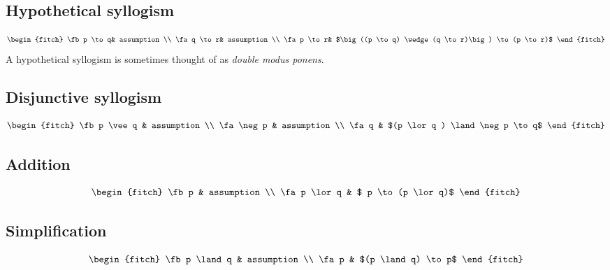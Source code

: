 \subsection{Hypothetical syllogism}
\begin{equation*}
  \begin{fitch}
    \fb p \to q& assumption \\
    \fa q \to r& assumption \\
    \fa p \to r& $\big((p \to q) \wedge (q \to r)\big) \to (p \to r)$
  \end{fitch}
\end{equation*}
A hypothetical syllogism is sometimes thought of as \emph{double modus ponens}.

\subsection{Disjunctive syllogism}
\begin{equation*}
  \begin{fitch}
    \fb p \vee q & assumption \\
    \fa \neg p   & assumption \\
    \fa q & $(p \lor q ) \land \neg p \to q$
  \end{fitch}
\end{equation*}

\subsection{Addition}
\begin{equation*}
  \begin{fitch}
    \fb p & assumption \\
    \fa p \lor q & $ p \to (p \lor q)$
  \end{fitch}
\end{equation*}

\subsection{Simplification}
\begin{equation*}
  \begin{fitch}
    \fb p \land q & assumption \\
    \fa p & $(p \land q) \to p$
  \end{fitch}
\end{equation*}


